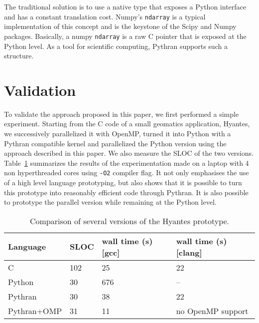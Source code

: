 \documentclass{llncs}
\begin{document}
The traditional solution is to use a native type that exposes a Python interface
and has a constant translation cost. Numpy's \texttt{ndarray} is a typical
implementation of this concept and is the keystone of the Scipy and Numpy
packages. Basically, a numpy \texttt{ndarray} is a raw C pointer that is exposed
at the Python level. As a tool for scientific computing, Pythran supports such a
structure.

\section{Validation}\label{sec:validation}

To validate the approach proposed in this paper, we first performed a simple
experiment. Starting from the C code of a small geomatics application, Hyantes,
we successively parallelized it with OpenMP, turned it into Python with a
Pythran compatible kernel and parallelized the Python version using the approach
described in this paper. We also measure the SLOC of the two versions.
Table~\ref{tbl:hyantes} summarizes the results of the experimentation made on a
laptop with 4 non hyperthreaded cores using \texttt{-O2} compiler flag. It not
only emphasises the use of a high level language prototyping, but also shows
that it is possible to turn this prototype into reasonably efficient code
through Pythran. It is also possible to prototype the parallel version while
remaining at the Python level.

\begin{table}

    \caption{Comparison of several versions of the Hyantes prototype.}
    \label{tbl:hyantes}

    \centering
    \begin{tabular}{|l|l|l|l|}
        \hline
        Language & SLOC & wall time (s) [gcc] & wall time (s) [clang]\\
        \hline
        C       & 102   & 25 & 22 \\
        Python  & 30    & 676 & --\\
        Pythran & 30    & 38 &  22 \\
        Pythran+OMP    & 31    & 11 & no OpenMP support\\
        \hline
    \end{tabular}

\end{table}
\end{document}
